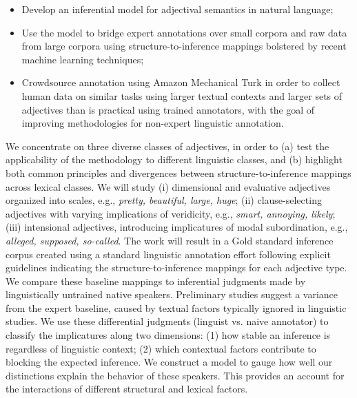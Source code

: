 \documentclass[10pt]{article}
\begin{document}
\vspace{-0.4em}
\begin{itemize}

\item Develop an inferential model for adjectival semantics in natural language;

\vspace{-0.5em}
\item Use the model to bridge expert annotations over small corpora and raw data from large corpora using structure-to-inference mappings bolstered by recent machine learning techniques;

\vspace{-0.5em}
\item Crowdsource annotation using Amazon Mechanical Turk in order to collect human data on similar tasks using larger textual contexts and larger sets of adjectives than is practical using trained annotators, with the goal of improving methodologies for non-expert linguistic annotation.
\end{itemize}

\vspace{-.5em}

We concentrate on three diverse classes of  adjectives, 
in order to (a) test the applicability of the methodology to different linguistic classes, and (b) highlight both common principles and divergences between structure-to-inference mappings across lexical classes. 
We will study
(i) dimensional and evaluative adjectives organized into scales, e.g., \textit{pretty, beautiful, large, huge}; 
(ii) clause-selecting adjectives with varying implications of veridicity, e.g., \textit{smart, annoying, likely}; 
(iii) intensional adjectives, introducing implicatures of modal subordination, e.g., \textit{alleged, supposed, so-called}. 
The work will result in a Gold standard inference corpus created using a standard linguistic annotation effort following explicit guidelines indicating the structure-to-inference mappings for each adjective type. 
We compare these baseline mappings to inferential judgments made by linguistically untrained native speakers. 
Preliminary studies suggest a variance from the expert baseline, caused by textual factors typically ignored in linguistic studies. 
We use these differential judgments (linguist vs. naive annotator) to classify the implicatures along two dimensions: (1) how stable an inference is regardless of linguistic context; (2) which contextual factors contribute to blocking the expected inference. 
We construct a model to gauge how well our distinctions explain the behavior of these speakers. This provides an account for the interactions of different structural and lexical factors. 
\end{document}
